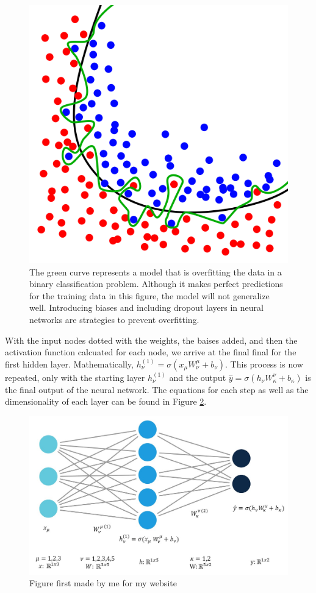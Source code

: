 \begin{figure}
    \centering
    \includegraphics[width=.5\linewidth]{Chapters/Figures/overfitting.png}
    \caption[Overfitting]{The green curve represents a model that is overfitting the data in a binary classification problem. Although it makes perfect predictions for the training data in this figure, the model will not generalize well. Introducing biases and including dropout layers in neural networks are strategies to prevent overfitting.}
    \label{fig:overfitting}
\end{figure}


With the input nodes dotted with the weights, the baises added, and then the activation function calcuated for each node, we arrive at the final final for the first hidden layer. Mathematically, $ h_\nu^{(1)} = \sigma\left( x_\mu W_\nu ^\mu + b_\nu \right) $. This process is now repeated, only with the starting layer $ h_\nu^{(1)} $ and the output
$ \hat{y} = \sigma \left( h_\nu W_\kappa ^\nu + b_\kappa \right)$ is the final output of the neural network. The equations for each step as well as the dimensionality of each layer can be found in Figure \ref{fig:simpleNN}.

\begin{figure}[h!]
    \centering
    \includegraphics[width=\linewidth]{Chapters/Figures/einstein_NN.png}
    \caption[Neural Network Example]{Figure first made by me for my website}
    \label{fig:simpleNN}
\end{figure}

